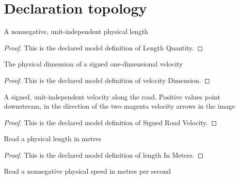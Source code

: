 \section{Declaration topology}
\begin{definition}
  \label{def:physics:phyx-mini-0729:phyxminiproblems-problemphyxmini0729-lengthquantity}
  A nonnegative, unit-independent physical length
\end{definition}
\begin{proof}
  This is the declared model definition of Length Quantity.
\end{proof}
\begin{definition}
  \label{def:physics:phyx-mini-0729:phyxminiproblems-problemphyxmini0729-velocitydimension}
  The physical dimension of a signed one-dimensional velocity
\end{definition}
\begin{proof}
  This is the declared model definition of velocity Dimension.
\end{proof}
\begin{definition}
  \label{def:physics:phyx-mini-0729:phyxminiproblems-problemphyxmini0729-signedroadvelocity}
  A signed, unit-independent velocity along the road. Positive values point downstream, in the direction of the two magenta velocity arrows in the image
\end{definition}
\begin{proof}
  This is the declared model definition of Signed Road Velocity.
\end{proof}
\begin{definition}
  \label{def:physics:phyx-mini-0729:phyxminiproblems-problemphyxmini0729-lengthinmeters}
  Read a physical length in metres
\end{definition}
\begin{proof}
  This is the declared model definition of length In Meters.
\end{proof}
\begin{definition}
  \label{def:physics:phyx-mini-0729:phyxminiproblems-problemphyxmini0729-speedinmeterspersecond}
  Read a nonnegative physical speed in metres per second
\end{definition}
